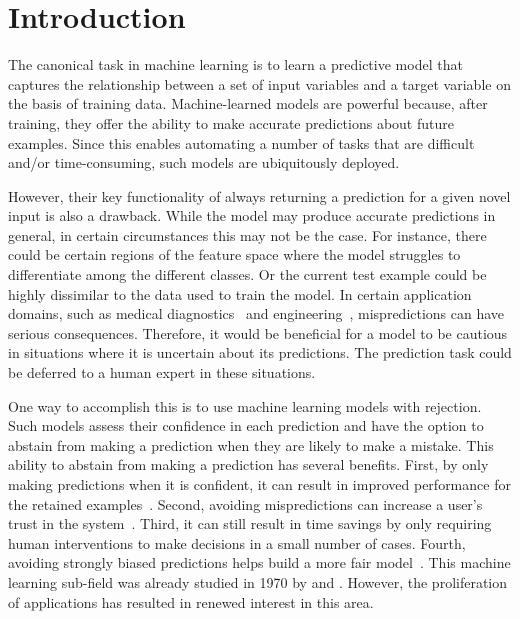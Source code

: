 \section{Introduction}
The canonical task in machine learning is to learn a predictive model that captures the relationship between a set of input variables and a target variable on the basis of training data. Machine-learned models are powerful because, after training, they offer the ability to make accurate predictions about future examples. Since this enables automating a number of tasks that are difficult and/or time-consuming, such models are ubiquitously deployed. 

However, their key functionality of always returning a prediction for a given novel input is also a drawback. While the model may produce accurate predictions in general, in certain circumstances this may not be the case. For instance, there could be certain regions of the feature space where the model struggles to differentiate among the different classes. Or the current test example could be highly dissimilar to the data used to train the model. In certain application domains, such as medical diagnostics~\citep{Kotropoulos2009} and engineering~\citep{Zou2011}, mispredictions can have serious consequences. Therefore, it would be beneficial for a model to be cautious in situations where it is uncertain about its predictions. The prediction task could be deferred to a human expert in these situations. 

One way to accomplish this is to use machine learning models with rejection. Such models assess their confidence in each prediction and have the option to abstain from making a prediction when they are likely to make a mistake. This ability to abstain from making a prediction has several benefits. First, by only making predictions when it is confident, it can result in improved performance for the retained examples~\citep{Pudil1992}. Second, avoiding mispredictions can increase a user's trust in the system~\citep{El-Yaniv2010}. Third, it can still result in time savings by only requiring human interventions to make decisions in a small number of cases. Fourth, avoiding strongly biased predictions helps build a more fair model~\citep{Lee2021,Ruggieri2023}.
This machine learning sub-field was already studied in 1970 by \citet{Chow1970a} and \citet{Hellman1970}. However, the proliferation of applications has resulted in renewed interest in this area.


